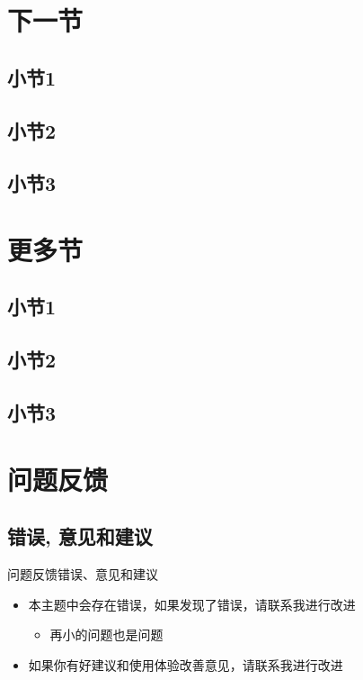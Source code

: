 \documentclass[t, aspectratio=169]{ctexbeamer}
\begin{document}
\section{下一节}
\subsection{小节1}
\subsection{小节2}
\subsection{小节3}
\section{更多节}
\subsection{小节1}
\subsection{小节2}
\subsection{小节3}

\section{问题反馈}
\subsection{错误, 意见和建议}
\begin{frame}{问题反馈}{错误、意见和建议}
  \begin{itemize}
  \item 本主题中会存在错误，如果发现了错误，请联系我进行改进
    \begin{itemize}
    \item \alert{再小的问题也是问题}
    \end{itemize}
  \item 如果你有好建议和使用体验改善意见，请联系我进行改进
  \end{itemize}
\end{frame}

\end{document}
